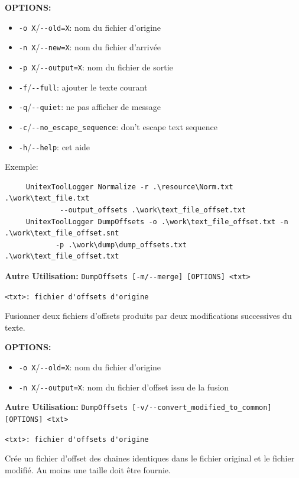 \bigskip
\noindent \textbf{OPTIONS:}

\begin{itemize} 	 
  \item \verb+-o X+/\verb+--old=X+: nom du fichier d'origine 
  \item \verb+-n X+/\verb+--new=X+:  nom du fichier d'arrivée
  \item \verb+-p X+/\verb+--output=X+: nom du fichier de sortie
  \item \verb+-f+/\verb+--full+: ajouter le texte courant
  \item \verb+-q+/\verb+--quiet+: ne pas afficher de message
  \item \verb+-c+/\verb+--no_escape_sequence+: don't escape text sequence 	 
  \item \verb+-h+/\verb+--help+: cet aide 	 
\end{itemize}

\noindent Exemple: 
\begin{verbatim}
	 UnitexToolLogger Normalize -r .\resource\Norm.txt .\work\text_file.txt 	 
	         --output_offsets .\work\text_file_offset.txt 	 
	 UnitexToolLogger DumpOffsets -o .\work\text_file_offset.txt -n .\work\text_file_offset.snt 	 
	        -p .\work\dump\dump_offsets.txt .\work\text_file_offset.txt 	 
\end{verbatim}

\bigskip
\noindent \textbf{Autre Utilisation:} \verb+DumpOffsets [-m/--merge] [OPTIONS] <txt>+

\bigskip
\noindent \verb+<txt>: fichier d'offsets d'origine+

\bigskip
\noindent Fusionner deux fichiers d'offsets produits par deux modifications successives du texte.

\bigskip
\noindent \textbf{OPTIONS:}

\begin{itemize} 	 
  \item \verb+-o X+/\verb+--old=X+: nom du fichier d'origine
  \item \verb+-n X+/\verb+--output=X+: nom du fichier d'offset issu de la fusion
\end{itemize}

\bigskip
\noindent \textbf{Autre Utilisation:} \verb+DumpOffsets [-v/--convert_modified_to_common] [OPTIONS] <txt>+

\bigskip
\noindent \verb+<txt>: fichier d'offsets d'origine+

\bigskip
\noindent Crée un fichier d'offset des chaines identiques dans le fichier original et le fichier modifié.
Au moins une taille doit être fournie.	 

